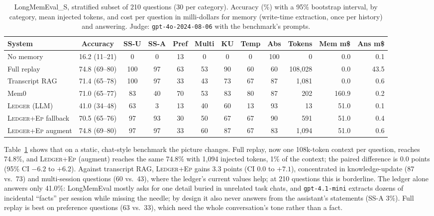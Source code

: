 \documentclass[10pt,conference]{IEEEtran}
\newcommand{\sys}{\textsc{Ledger}}
\newcommand{\hyb}{\textsc{Ledger+Ep}}
\begin{document}
\begin{table}[t]
\caption{LongMemEval\_S, stratified subset of 210 questions (30 per category).
Accuracy (\%) with a 95\% bootstrap interval, by category, mean injected tokens,
and cost per question in milli-dollars for memory (write-time extraction, once per
history) and answering. Judge: \texttt{gpt-4o-2024-08-06} with the benchmark's prompts.}
\label{tab:lme}
\centering
\footnotesize
\begin{tabular}{@{}lc ccccccc rrr@{}}
\toprule
System & Accuracy & SS-U & SS-A & Pref & Multi & KU & Temp & Abs & Tokens & Mem m\$ & Ans m\$ \\
\midrule
No memory & 16.2 (11--21) & 0 & 0 & 13 & 0 & 0 & 0 & 100 & 0 & 0.0 & 0.1 \\
Full replay & 74.8 (69--80) & 100 & 97 & 63 & 53 & 90 & 60 & 60 & 108{,}028 & 0.0 & 43.5 \\
Transcript RAG & 71.4 (65--78) & 100 & 97 & 33 & 43 & 73 & 67 & 87 & 1{,}081 & 0.0 & 0.6 \\
Mem0 & 71.0 (65--77) & 83 & 40 & 70 & 53 & 83 & 80 & 87 & 202 & 160.9 & 0.2 \\
\sys{} (LLM) & 41.0 (34--48) & 63 & 3 & 13 & 40 & 60 & 13 & 93 & 13 & 51.0 & 0.1 \\
\hyb{} fallback & 70.5 (65--76) & 97 & 93 & 30 & 50 & 67 & 67 & 90 & 591 & 51.0 & 0.4 \\
\hyb{} augment & 74.8 (69--80) & 97 & 97 & 33 & 60 & 87 & 67 & 83 & 1{,}094 & 51.0 & 0.6 \\
\bottomrule
\end{tabular}
\end{table}

Table~\ref{tab:lme} shows that on a static, chat-style benchmark the picture
changes. Full replay, now one 108k-token context per question, reaches 74.8\%,
and \hyb{} (augment) reaches the same 74.8\% with 1{,}094 injected tokens, 1\% of
the context; the paired difference is 0.0 points (95\% CI $-6.2$ to $+6.2$). Against
transcript RAG, \hyb{} gains 3.3 points (CI $0.0$ to $+7.1$), concentrated in
knowledge-update (87 vs.\ 73) and multi-session questions (60 vs.\ 43), where
the ledger's current values help; at 210 questions this is borderline. The ledger
alone answers only 41.0\%: LongMemEval mostly asks for one detail buried in
unrelated task chats, and \texttt{gpt-4.1-mini} extracts dozens of incidental
``facts'' per session while missing the needle; by design it also never answers
from the assistant's statements (SS-A 3\%). Full replay is best on
preference questions (63 vs.\ 33), which need the whole conversation's tone rather
than a fact.
\end{document}
